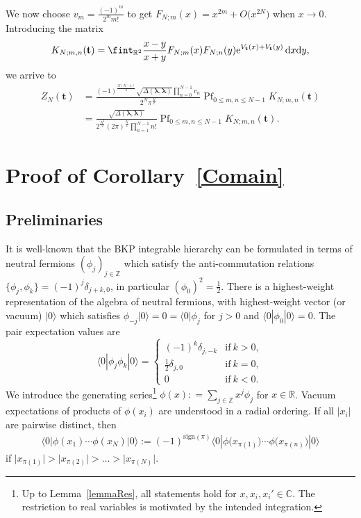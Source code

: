 \documentclass[pdftex]{sigma}
\numberwithin{equation}{section}
\newcommand{\dd}{\mathrm{d}}
\begin{document}
We now choose $v_m = \frac{(-1)^m}{2^m m!}$ to get $F_{N;m}(x) = x^{2m} + O\bigl(x^{2N}\bigr)$ when $x \rightarrow 0$. Introducing the matrix
\[
K_{N;m,n}(\mathbf{t}) = \fint_{\mathbb{R}^2} \frac{x - y}{x + y}F_{N;m}(x)F_{N;n}(y) {\rm e}^{V_{\mathbf{t}}(x) + V_{\mathbf{t}}(y)}\, \dd x \dd y,
\]
we arrive to
\begin{equation*}
\begin{split}
Z_N(\mathbf{t}) & = \frac{(-1)^{\frac{N(N - 1)}{2}} \sqrt{\Delta(\boldsymbol{\lambda},\boldsymbol{\lambda})} \prod_{n = 0}^{N - 1} v_n}{2^N \pi^{\frac{N}{2}}}   \operatorname{Pf}_{0 \leq m,n \leq N - 1} K_{N;m,n}(\mathbf{t}) \\
& = \frac{\sqrt{\Delta(\boldsymbol{\lambda},\boldsymbol{\lambda})}}{2^{\frac{N^2}{2}} (2\pi)^{\frac{N}{2}} \prod_{n = 1}^{N - 1} n!}  \operatorname{Pf}_{0 \leq m,n \leq N - 1} K_{N;m,n}(\mathbf{t}).
\end{split}
\end{equation*}


 \section{Proof of Corollary~\ref{Comain}}
\label{SproofBKP}


\subsection{Preliminaries}
It is well-known that the BKP integrable hierarchy can be formulated
in terms of
neutral fermions $(\phi_j)_{j \in \mathbb{Z}}$ which satisfy
the anti-commutation relations
$ \{\phi_j,\phi_k\} =(-1)^j \delta_{j+k,0}$,
in particular $(\phi_0)^2=\tfrac{1}{2}$. There is a highest-weight representation of the algebra of neutral fermions, with highest-weight vector (or vacuum) $|0\rangle$
which satisfies
$\phi_{-j} |0\rangle =0 =\langle 0| \phi_{j}$ for $j>0$ and
$\langle 0|\phi_0|0\rangle=0$. The pair expectation values are
\begin{equation}
\label{pair-expectation}
 \langle 0| \phi_j \phi_k |0\rangle =
 \begin{cases}
 (-1)^k\delta_{j,-k}& \text{if}\ k>0,\\
\frac{1}{2}\delta_{j,0}& \text{if}\ k=0,\\
 0& \text{if}\ k<0.
 \end{cases}
 \end{equation}
 We introduce the generating series\footnote{Up to Lemma~\ref{lemmaRes},
 all statements hold for $x,x_i,x_i'\in \mathbb{C}$. The restriction to
 real variables is motivated by the intended integration.}
$ \phi(x): = \sum_{j \in \mathbb {Z}} x^j \phi_j $
for $x \in \mathbb{R}$. Vacuum expectations of
products of $\phi(x_i)$ are understood in a radial ordering. If
all $|x_i|$ are pairwise distinct, then
\begin{gather}
 \langle 0|\phi(x_1)\cdots \phi(x_{N})|0\rangle
:=(-1)^{\mathrm{sign}(\pi)}
\langle 0|\phi\bigl(x_{\pi(1)}\bigr)\cdots \phi\bigl(x_{\pi(n)}\bigr)|0\rangle\label{radialordering}
\end{gather}
if $\bigl|x_{\pi(1)}\bigr|>\bigl|x_{\pi(2)}\bigr|>\dots >\bigl|x_{\pi(N)}\bigr|$.
\end{document}
